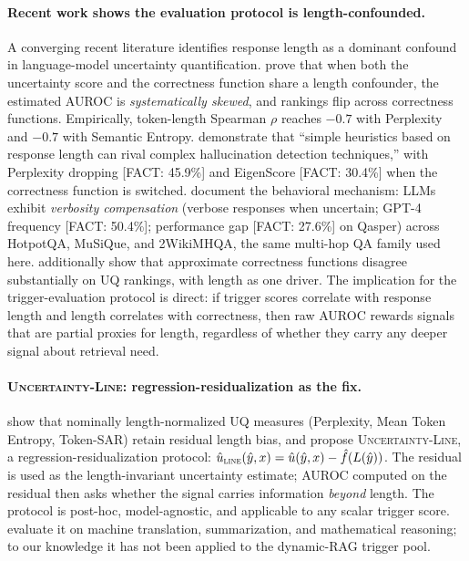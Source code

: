 \documentclass[11pt]{article}
\newcommand{\FACT}[1]{{\color{blue}\textsf{[FACT: #1]}}}
\begin{document}
\paragraph{Recent work shows the evaluation protocol is length-confounded.}
A converging recent literature identifies response length as a dominant
confound in language-model uncertainty quantification.
\cite{Santilli_RevisitingUQEvaluationLengthBias} prove that when both the
uncertainty score and the correctness function share a length confounder, the
estimated AUROC is \emph{systematically skewed}, and rankings flip across
correctness functions. Empirically, token-length Spearman $\rho$ reaches $-0.7$
with Perplexity and $-0.7$ with Semantic Entropy.
\cite{Janiak_IllusionProgressHallucinationDetection} demonstrate that
``simple heuristics based on response length can rival complex hallucination
detection techniques,'' with Perplexity dropping \FACT{45.9\%} and EigenScore
\FACT{30.4\%} when the correctness function is switched.
\cite{Zhang_VerbosityVeracityVCBehavior} document the behavioral mechanism:
LLMs exhibit \emph{verbosity compensation} (verbose responses when uncertain;
GPT-4 frequency \FACT{50.4\%}; performance gap \FACT{27.6\%} on Qasper) across
HotpotQA, MuSiQue, and 2WikiMHQA, the same multi-hop QA family used here.
\cite{Ielanskyi_PitfallsUQEvaluationNLG} additionally show that approximate
correctness functions disagree substantially on UQ rankings, with length as
one driver.
The implication for the trigger-evaluation protocol is direct: if trigger
scores correlate with response length and length correlates with correctness,
then raw AUROC rewards signals that are partial proxies for length,
regardless of whether they carry any deeper signal about retrieval need.

\paragraph{\textsc{Uncertainty-Line}: regression-residualization as the fix.}
\cite{Vashurin_UncertaintyLineLengthInvariant} show that nominally
length-normalized UQ measures (Perplexity, Mean Token Entropy, Token-SAR)
retain residual length bias, and propose \textsc{Uncertainty-Line}, a
regression-residualization protocol:
$\hat{u}_{\textsc{line}}(\hat{y}, x) = \hat{u}(\hat{y}, x) - \hat{f}(L(\hat{y}))$.
The residual is used as the length-invariant uncertainty estimate; AUROC
computed on the residual then asks whether the signal carries information
\emph{beyond} length. The protocol is post-hoc, model-agnostic, and applicable
to any scalar trigger score. \cite{Vashurin_UncertaintyLineLengthInvariant}
evaluate it on machine translation, summarization, and mathematical reasoning;
to our knowledge it has not been applied to the dynamic-RAG trigger pool.
\end{document}
